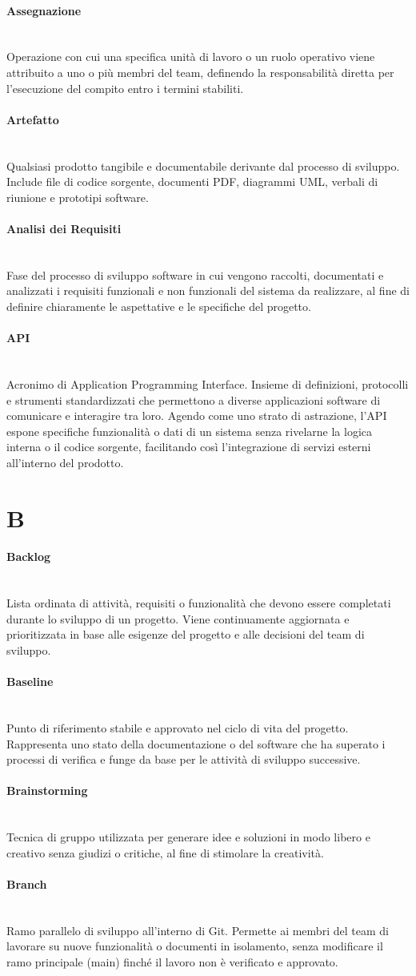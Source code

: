 \documentclass[a4paper, 10pt, colorlinks=true, linkcolor=black, urlcolor=blue, citecolor=blue, hidelinks]{article}
\newcommand{\glossaryterm}[2]{
    \paragraph{#1 \label{term:#1}} \mbox{} \\
    #2
    \vspace{0.5em}
}
\begin{document}
\glossaryterm{Assegnazione}{Operazione con cui una specifica unità di lavoro o un ruolo operativo viene attribuito a uno o più membri del team, definendo la responsabilità diretta per l'esecuzione del compito entro i termini stabiliti.}

\glossaryterm{Artefatto}{Qualsiasi prodotto tangibile e documentabile derivante dal processo di sviluppo. Include file di codice sorgente, documenti PDF, diagrammi UML, verbali di riunione e prototipi software.}

\glossaryterm{Analisi dei Requisiti}{Fase del processo di sviluppo software in cui vengono raccolti, documentati e analizzati i requisiti funzionali e non funzionali del sistema da realizzare, al fine di definire chiaramente le aspettative e le specifiche del progetto.}

\glossaryterm{API}{Acronimo di Application Programming Interface. Insieme di definizioni, protocolli e strumenti standardizzati che permettono a diverse applicazioni software di comunicare e interagire tra loro. Agendo come uno strato di astrazione, l'API espone specifiche funzionalità o dati di un sistema senza rivelarne la logica interna o il codice sorgente, facilitando così l'integrazione di servizi esterni all'interno del prodotto.}

\newpage

\section*{B}

\glossaryterm{Backlog}{Lista ordinata di attività, requisiti o funzionalità che devono essere completati durante lo sviluppo di un progetto. Viene continuamente aggiornata e prioritizzata in base alle esigenze del progetto e alle decisioni del team di sviluppo.}

\glossaryterm{Baseline}{Punto di riferimento stabile e approvato nel ciclo di vita del progetto. Rappresenta uno stato della documentazione o del software che ha superato i processi di verifica e funge da base per le attività di sviluppo successive.}

\glossaryterm{Brainstorming}{Tecnica di gruppo utilizzata per generare idee e soluzioni in modo libero e creativo senza giudizi o critiche, al fine di stimolare la creatività.}

\glossaryterm{Branch}{Ramo parallelo di sviluppo all'interno di Git. Permette ai membri del team di lavorare su nuove funzionalità o documenti in isolamento, senza modificare il ramo principale (main) finché il lavoro non è verificato e approvato.}
\end{document}
